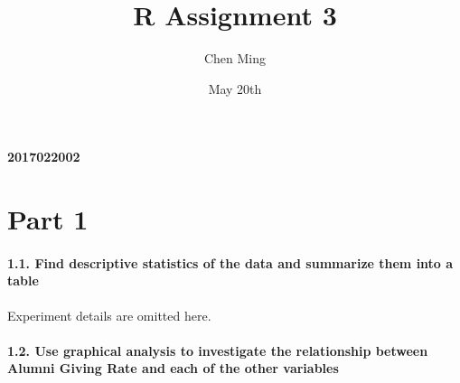 \documentclass[]{article}
\title{R Assignment 3}
\author{Chen Ming}
\date{May 20th}
\let\oldparagraph\paragraph
\renewcommand{\paragraph}[1]{\oldparagraph{#1}\mbox{}}
\begin{document}
\maketitle

\hypertarget{section}{%
\paragraph{2017022002}\label{section}}

\hypertarget{part-1}{%
\section{Part 1}\label{part-1}}

\hypertarget{find-descriptive-statistics-of-the-data-and-summarize-them-into-a-table}{%
\paragraph{\texorpdfstring{\textbf{1.1. Find descriptive statistics of
the data and summarize them into a
table}}{1.1. Find descriptive statistics of the data and summarize them into a table}}\label{find-descriptive-statistics-of-the-data-and-summarize-them-into-a-table}}

Experiment details are omitted here.

\hypertarget{use-graphical-analysis-to-investigate-the-relationship-between-alumni-giving-rate-and-each-of-the-other-variables}{%
\paragraph{\texorpdfstring{\textbf{1.2. Use graphical analysis to
investigate the relationship between Alumni Giving Rate and each of the
other
variables}}{1.2. Use graphical analysis to investigate the relationship between Alumni Giving Rate and each of the other variables}}\label{use-graphical-analysis-to-investigate-the-relationship-between-alumni-giving-rate-and-each-of-the-other-variables}}
\end{document}
